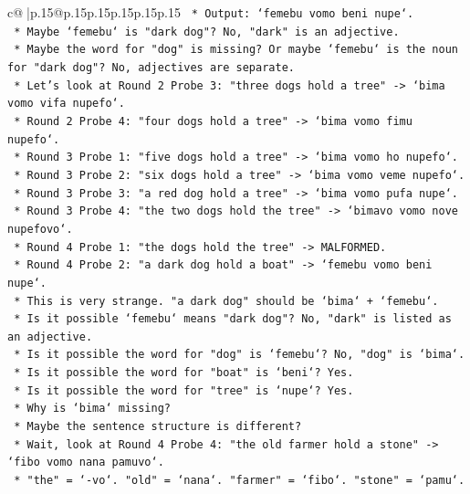 \documentclass{article}
\begin{document}
{\begin{supertabular}{c@{$\;$}|p{.15\linewidth}@{}p{.15\linewidth}p{.15\linewidth}p{.15\linewidth}p{.15\linewidth}p{.15\linewidth}}
{{{\texttt{            *   Output: `femebu vomo beni nupe`.} \\
\texttt{            *   Maybe `femebu` is "dark dog"? No, "dark" is an adjective.} \\
\texttt{            *   Maybe the word for "dog" is missing? Or maybe `femebu` is the noun for "dark dog"? No, adjectives are separate.} \\
\texttt{            *   Let's look at Round 2 Probe 3: "three dogs hold a tree" {-}> `bima vomo vifa nupefo`.} \\
\texttt{            *   Round 2 Probe 4: "four dogs hold a tree" {-}> `bima vomo fimu nupefo`.} \\
\texttt{            *   Round 3 Probe 1: "five dogs hold a tree" {-}> `bima vomo ho nupefo`.} \\
\texttt{            *   Round 3 Probe 2: "six dogs hold a tree" {-}> `bima vomo veme nupefo`.} \\
\texttt{            *   Round 3 Probe 3: "a red dog hold a tree" {-}> `bima vomo pufa nupe`.} \\
\texttt{            *   Round 3 Probe 4: "the two dogs hold the tree" {-}> `bimavo vomo nove nupefovo`.} \\
\texttt{            *   Round 4 Probe 1: "the dogs hold the tree" {-}> MALFORMED.} \\
\texttt{            *   Round 4 Probe 2: "a dark dog hold a boat" {-}> `femebu vomo beni nupe`.} \\
\texttt{                *   This is very strange. "a dark dog" should be `bima` + `femebu`.} \\
\texttt{                *   Is it possible `femebu` means "dark dog"? No, "dark" is listed as an adjective.} \\
\texttt{                *   Is it possible the word for "dog" is `femebu`? No, "dog" is `bima`.} \\
\texttt{                *   Is it possible the word for "boat" is `beni`? Yes.} \\
\texttt{                *   Is it possible the word for "tree" is `nupe`? Yes.} \\
\texttt{                *   Why is `bima` missing?} \\
\texttt{                *   Maybe the sentence structure is different?} \\
\texttt{                *   Wait, look at Round 4 Probe 4: "the old farmer hold a stone" {-}> `fibo vomo nana pamuvo`.} \\
\texttt{                    *   "the" = `{-}vo`. "old" = `nana`. "farmer" = `fibo`. "stone" = `pamu`.} \\
}}}
\end{supertabular}}
\end{document}
